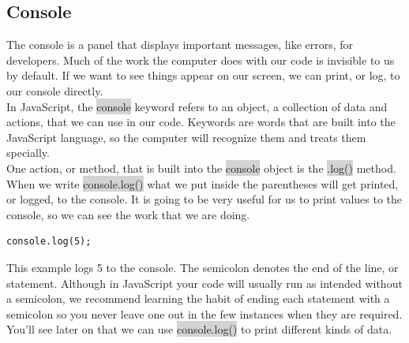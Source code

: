 \documentclass[11pt]{article}
\begin{document}
\subsection{Console}
The console is a panel that displays important messages, like errors, for developers. Much of the work the computer does with our code is invisible to us by default. If we want to see things appear on our screen, we can print, or log, to our console directly. \\
\newline
In JavaScript, the \colorbox{lightgray}{console} keyword refers to an object, a collection of data and actions, that we can use in our code. Keywords are words that are built into the JavaScript language, so the computer will recognize them and treats them specially. \\
\newline
One action, or method, that is built into the \colorbox{lightgray}{console} object is the \colorbox{lightgray}{.log()} method. When we write \colorbox{lightgray}{console.log()} what we put inside the parentheses will get printed, or logged, to the console. It is going to be very useful for us to print values to the console, so we can see the work that we are doing.
\begin{lstlisting}
console.log(5); 
\end{lstlisting}
This example logs 5 to the console. The semicolon denotes the end of the line, or statement. Although in JavaScript your code will usually run as intended without a semicolon, we recommend learning the habit of ending each statement with a semicolon so you never leave one out in the few instances when they are required. \\
\newline
You’ll see later on that we can use \colorbox{lightgray}{console.log()} to print different kinds of data.
\end{document}
